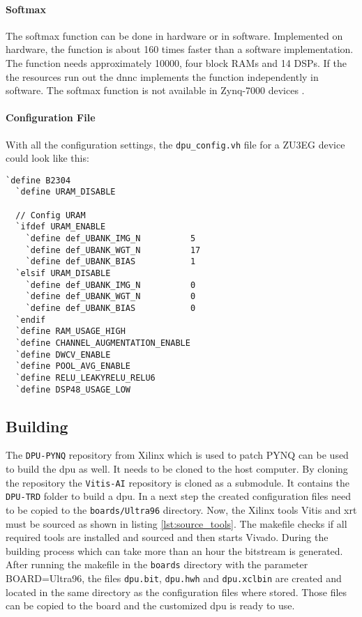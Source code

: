 \paragraph{Softmax}
The softmax function can be done in hardware or in software.
Implemented on hardware, the function is about 160 times faster than a software implementation.
The function needs approximately \SI{10000}{}, four block RAMs and 14 DSPs.
If the the resources run out the \acrlong{dnnc} implements the function independently in software.
The softmax function is not available in Zynq-7000 devices \cite{dpu_product_guide}. 

\paragraph{Configuration File}
With all the configuration settings, the \texttt{dpu\_config.vh} file for a ZU3EG device could look like this:

\begin{lstlisting}[style=bash, caption={Configure \acrshort{dpu}}, label=lst:config_dpu]
  `define B2304
  `define URAM_DISABLE 

  // Config URAM
  `ifdef URAM_ENABLE
    `define def_UBANK_IMG_N          5
    `define def_UBANK_WGT_N          17
    `define def_UBANK_BIAS           1
  `elsif URAM_DISABLE
    `define def_UBANK_IMG_N          0
    `define def_UBANK_WGT_N          0
    `define def_UBANK_BIAS           0
  `endif
  `define RAM_USAGE_HIGH
  `define CHANNEL_AUGMENTATION_ENABLE
  `define DWCV_ENABLE
  `define POOL_AVG_ENABLE
  `define RELU_LEAKYRELU_RELU6
  `define DSP48_USAGE_LOW
\end{lstlisting}

\subsection{Building}
\label{subsec:embedded_platform:dpu:building}

The \texttt{DPU-PYNQ} repository from Xilinx which is used to patch PYNQ can be used to build the \acrshort{dpu} as well.
It needs to be cloned to the host computer.
By cloning the repository the \texttt{Vitis-AI} repository is cloned as a submodule.
It contains the \texttt{DPU-TRD} folder to build a \acrshort{dpu}.
In a next step the created configuration files need to be copied to the \texttt{boards/Ultra96} directory.
Now, the Xilinx tools Vitis and \acrshort{xrt} must be sourced as shown in listing \ref{lst:source_tools}.
The makefile checks if all required tools are installed and sourced and then starts Vivado.
During the building process which can take more than an hour the bitstream is generated. 
After running the makefile in the \texttt{boards} directory with the parameter BOARD=Ultra96, the files \texttt{dpu.bit}, \texttt{dpu.hwh} and \texttt{dpu.xclbin} are created and located in the same directory as the configuration files where stored.
Those files can be copied to the board and the customized \acrshort{dpu} is ready to use.

